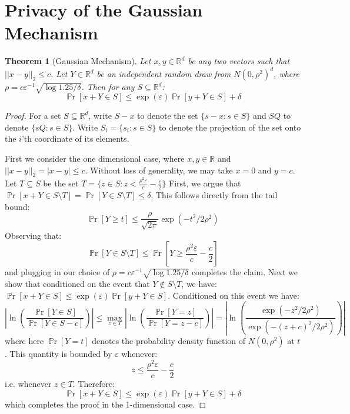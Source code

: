 \documentclass[letterpaper,11pt]{article}
\newtheorem{theorem}{Theorem}[section]
\theoremstyle{definition}
\newcommand{\Psymb}{\mathbb{P}}
\DeclareMathOperator*{\ProbOp}{\Psymb r}
\renewcommand{\Pr}{\ProbOp}
\renewcommand{\leq}{\leqslant}
\renewcommand{\geq}{\geqslant}
\renewcommand{\epsilon}{\varepsilon}
\begin{document}




\appendix
\section{Privacy of the Gaussian Mechanism}

\begin{theorem}[Gaussian Mechanism]
Let $x, y \in \mathbb{R}^d$ be any two vectors such that $||x-y||_2 \leq c$. Let $Y \in \mathbb{R}^d$ be an independent random draw from $N(0,\rho^2)^d$, where $\rho = c\epsilon^{-1}\sqrt{\log 1.25/\delta}$. Then for any $S \subseteq \mathbb{R}^d$:
$$\Pr[x + Y \in S] \leq \exp(\epsilon)\Pr[y + Y \in S] + \delta$$
\end{theorem}
\begin{proof}
For a set $S \subseteq \mathbb{R}^d$, write $S - x$ to denote the set $\{s - x : s\in S\}$ and $SQ$ to denote $\{sQ : s \in S\}$. Write $S_i = \{s_i : s \in S\}$ to denote the projection of the set onto the $i$'th coordinate of its elements.

First we consider the one dimensional case, where $x, y \in \mathbb{R}$ and $||x-y||_2 = |x-y| \leq c$. Without loss of generality, we may take $x = 0$ and $y = c$. Let $T \subseteq S$ be the set $T = \{z \in S : z < \frac{\rho^2\epsilon}{c} - \frac{c}{2}\}$ First, we argue that $\Pr[x + Y \in S\setminus T] = \Pr[Y \in S \setminus T] \leq \delta$. This follows directly from the tail bound:
$$\Pr[Y \geq t] \leq \frac{\rho}{\sqrt{2\pi}}\exp(-t^2/2\rho^2)$$
Observing that:
$$\Pr[Y \in S \setminus T] \leq \Pr[Y \geq \frac{\rho^2\epsilon}{c} - \frac{c}{2}]$$
and plugging in our choice of  $\rho = c\epsilon^{-1}\sqrt{\log 1.25/\delta}$ completes the claim. Next we show that conditioned on the event that $Y \not\in S \setminus T$, we have:  $\Pr[x + Y \in S] \leq \exp(\epsilon)\Pr[y + Y \in S]$. Conditioned on this event we have:
$$\left|\ln\left(\frac{\Pr[Y \in S]}{\Pr[Y \in S-c]}\right)\right| \leq \max_{z \in T} \left|\ln\left(\frac{\Pr[Y = z]}{\Pr[Y = z-c]}\right)\right| =\left|\ln\left(\frac{\exp(-z^2/2\rho^2)}{\exp(-(z+c)^2/2\rho^2)}  \right)\right|$$
where here $\Pr[Y = t]$ denotes the probability density function of $N(0,\rho^2)$ at $t$.
This quantity is bounded by $\epsilon$ whenever:
$$z \leq \frac{\rho^2\epsilon}{c} - \frac{c}{2}$$
i.e. whenever $z \in T$.
Therefore:
$$\Pr[x + Y \in S] \leq \exp(\epsilon)\Pr[y + Y \in S] + \delta$$
which completes the proof in the 1-dimensional case.




\end{proof}
\end{document}
